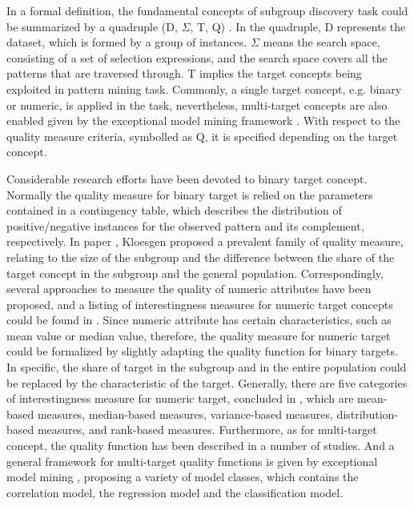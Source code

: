 In a formal definition, the fundamental concepts of subgroup discovery task could be summarized by a quadruple (D, $\Sigma$, T, Q) \cite{lemmerich2014novel}. In the quadruple, D represents the dataset, which is formed by a group of instances. $\Sigma$ means the search space, consisting of a set of selection expressions, and the search space covers all the patterns that are traversed through. T implies the target concepts being exploited in pattern mining task. Commonly, a single target concept, e.g. binary or numeric, is applied in the task, nevertheless, multi-target concepts are also enabled given by the exceptional model mining framework \cite{leman2008exceptional}. With respect to the quality measure criteria, symbolled as Q, it is specified depending on the target concept. 

Considerable research efforts have been devoted to binary target concept. Normally the quality measure for binary target is relied on the parameters contained in a contingency table, which describes the distribution of positive/negative instances for the observed pattern and its complement, respectively. In paper \cite{klosgen1996explora}, Kloesgen proposed a prevalent family of quality measure, relating to the size of the subgroup and the difference between the share of the target concept in the subgroup and the general population. Correspondingly, several approaches to measure the quality of numeric attributes have been proposed, and a listing of interestingness measures for numeric target concepts could be found in \cite{pieters2010subgroup}. Since numeric attribute has certain characteristics, such as mean value or median value, therefore, the quality measure for numeric target could be formalized by slightly adapting the quality function for binary targets. In specific, the share of target in the subgroup and in the entire population could be replaced by the characteristic of the target. Generally, there are five categories of interestingness measure for numeric target, concluded in \cite{lemmerich2014novel}, which are mean-based measures, median-based measures, variance-based measures, distribution-based measures, and rank-based measures. Furthermore, as for multi-target concept, the quality function has been described in a number of studies. And a general framework for multi-target quality functions is given by exceptional model mining \cite{leman2008exceptional}, proposing a variety of model classes, which contains the correlation model, the regression model and the classification model. 

